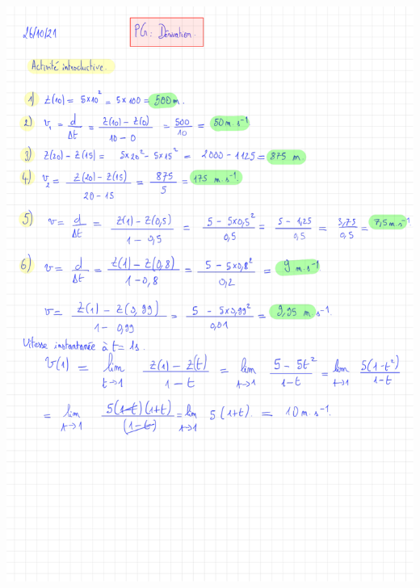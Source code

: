 \documentclass[11pt]{article}
\begin{document}
\begin{center}
\includegraphics[scale=0.9]{.data/Derivation-corrigé.pdf}
\end{center}
\end{document}

